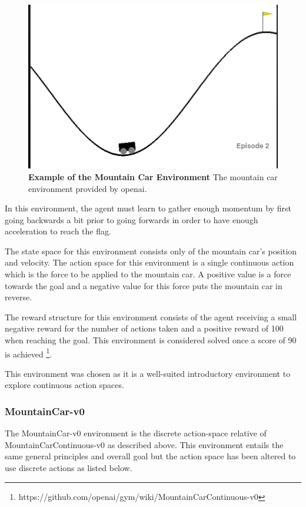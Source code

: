 \documentclass[conference]{IEEEtran}
\begin{document}
\begin{figure}[htbp]
\centerline{\includegraphics[scale=0.5]{mountain_car.png}}
\caption{\textbf{Example of the Mountain Car Environment}  The mountain car environment provided by openai.}
\label{fig:mountainCarEnvironment}
\end{figure}

In this environment, the agent must learn to gather enough momentum by first going backwards a bit prior to going forwards in order to have enough acceleration to reach the flag.

The state space for this environment consists only of the mountain car's position and velocity.
The action space for this environment is a single continuous action which is the force to be applied to the mountain car.
A positive value is a force towards the goal and a negative value for this force puts the mountain car in reverse.

The reward structure for this environment consists of the agent receiving a small negative reward for the number of actions taken and a positive reward of 100 when reaching the goal.
This environment is considered solved once a score of 90 is achieved \footnote{https://github.com/openai/gym/wiki/MountainCarContinuous-v0}.

This environment was chosen as it is a well-suited introductory environment to explore continuous action spaces.

\subsubsection{MountainCar-v0}
The MountainCar-v0 environment is the discrete action-space relative of MountainCarContinuous-v0 as described above.
This environment entails the same general principles and overall goal but the action space has been altered to use discrete actions as listed below.
\end{document}
